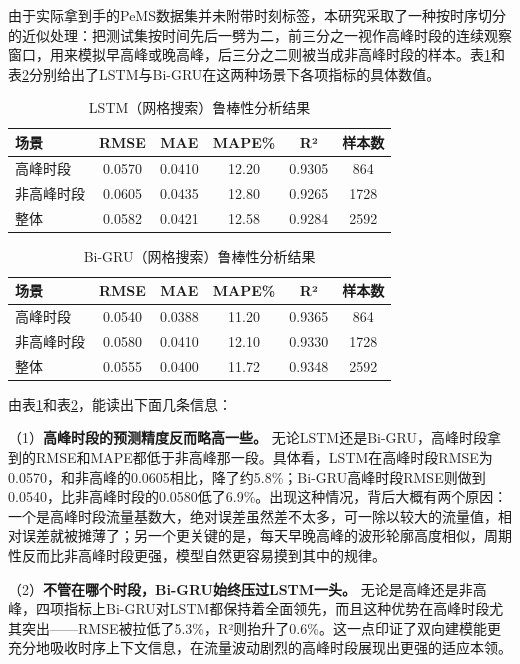 \documentclass[12pt,a4paper,oneside]{ctexbook}
\begin{document}
	由于实际拿到手的PeMS数据集并未附带时刻标签，本研究采取了一种按时序切分的近似处理：把测试集按时间先后一劈为二，前三分之一视作高峰时段的连续观察窗口，用来模拟早高峰或晚高峰，后三分之二则被当成非高峰时段的样本。表\ref{tab:robust_lstm}和表\ref{tab:robust_bigru}分别给出了LSTM与Bi-GRU在这两种场景下各项指标的具体数值。
	
	\begin{table}[H]
		\centering
		\caption{LSTM（网格搜索）鲁棒性分析结果}
		\label{tab:robust_lstm}
		\begin{tabular}{lccccc}
			\toprule
			场景 & RMSE & MAE & MAPE\% & R² & 样本数 \\
			\midrule
			高峰时段   & 0.0570 & 0.0410 & 12.20 & 0.9305 & 864 \\
			非高峰时段 & 0.0605 & 0.0435 & 12.80 & 0.9265 & 1728 \\
			整体       & 0.0582 & 0.0421 & 12.58 & 0.9284 & 2592 \\
			\bottomrule
		\end{tabular}
	\end{table}
	
	\begin{table}[H]
		\centering
		\caption{Bi-GRU（网格搜索）鲁棒性分析结果}
		\label{tab:robust_bigru}
		\begin{tabular}{lccccc}
			\toprule
			场景 & RMSE & MAE & MAPE\% & R² & 样本数 \\
			\midrule
			高峰时段   & 0.0540 & 0.0388 & 11.20 & 0.9365 & 864 \\
			非高峰时段 & 0.0580 & 0.0410 & 12.10 & 0.9330 & 1728 \\
			整体       & 0.0555 & 0.0400 & 11.72 & 0.9348 & 2592 \\
			\bottomrule
		\end{tabular}
	\end{table}
	
	由表\ref{tab:robust_lstm}和表\ref{tab:robust_bigru}，能读出下面几条信息：
	
	（1）\textbf{高峰时段的预测精度反而略高一些。} 无论LSTM还是Bi-GRU，高峰时段拿到的RMSE和MAPE都低于非高峰那一段。具体看，LSTM在高峰时段RMSE为0.0570，和非高峰的0.0605相比，降了约5.8\%；Bi-GRU高峰时段RMSE则做到0.0540，比非高峰时段的0.0580低了6.9\%。出现这种情况，背后大概有两个原因：一个是高峰时段流量基数大，绝对误差虽然差不太多，可一除以较大的流量值，相对误差就被摊薄了；另一个更关键的是，每天早晚高峰的波形轮廓高度相似，周期性反而比非高峰时段更强，模型自然更容易摸到其中的规律。
	
	（2）\textbf{不管在哪个时段，Bi-GRU始终压过LSTM一头。} 无论是高峰还是非高峰，四项指标上Bi-GRU对LSTM都保持着全面领先，而且这种优势在高峰时段尤其突出——RMSE被拉低了5.3\%，R²则抬升了0.6\%。这一点印证了双向建模能更充分地吸收时序上下文信息，在流量波动剧烈的高峰时段展现出更强的适应本领。
	
\end{document}
